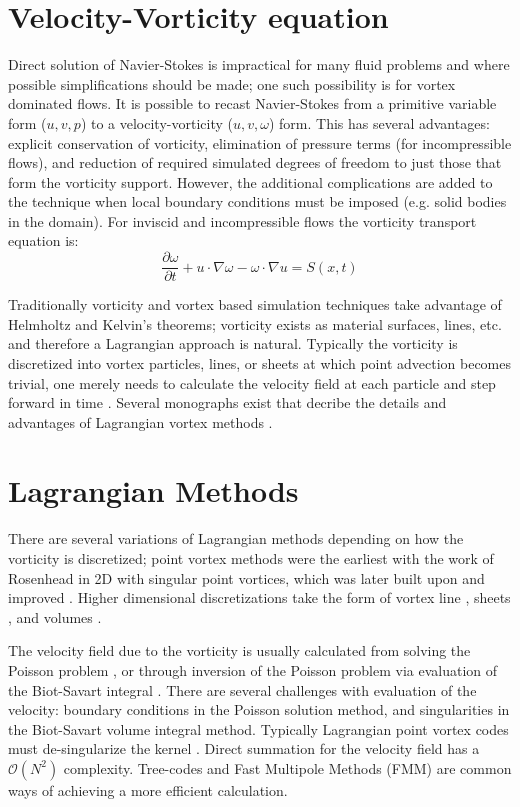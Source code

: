 \documentclass[letterpaper,12pt]{report}
\newcommand{\ben}[1]{\begin{equation}\label{#1}}
\newcommand{\ee}{\end{equation}}
\begin{document}
\section{Velocity-Vorticity equation}
Direct solution of Navier-Stokes is impractical for many fluid problems and where possible simplifications should be made; one such possibility is for vortex dominated flows. It is possible to recast Navier-Stokes from a primitive variable form ($u,v,p$) to a velocity-vorticity ($u,v,\omega$) form. This has several advantages: explicit conservation of vorticity, elimination of pressure terms (for incompressible flows), and reduction of required simulated degrees of freedom to just those that form the vorticity support. However, the additional complications are added to the technique when local boundary conditions must be imposed (e.g. solid bodies in the domain). For inviscid and incompressible flows the vorticity transport equation is:
\ben{VV3D} \frac{\partial \omega}{\partial t} + u \cdot \nabla \omega - \omega \cdot \nabla u = S(x,t)\ee

Traditionally vorticity and vortex based simulation techniques take advantage of Helmholtz and Kelvin's theorems; vorticity exists as material surfaces, lines, etc. and therefore a Lagrangian approach is natural. Typically the vorticity is discretized into vortex particles, lines, or sheets at which point advection becomes trivial, one merely needs to calculate the velocity field at each particle and step forward in time \cite{Strain1996,MoussaCarley2008,KoumLeonard1995}. Several monographs exist that decribe the details and advantages of Lagrangian vortex methods \cite{Lugt1983,Saffman1992,Speziale1987}.

\section{Lagrangian Methods}
There are several variations of Lagrangian methods depending on how the vorticity is discretized; point vortex methods were the earliest with the work of Rosenhead \cite{Point1} in 2D with singular point vortices, which was later built upon and improved \cite{Point2,Point3,Point4,Point5,Point6}. Higher dimensional discretizations take the form of vortex line \cite{Line1,Line2,Line3,Line4}, sheets \cite{Sheet1,Sheet2,Sheet3}, and volumes \cite{Volumes1,Volumes2,Volumes3}.

The velocity field due to the vorticity is usually calculated from solving the Poisson problem \cite{MiscMeth1}, or through inversion of the Poisson problem via evaluation of the Biot-Savart integral \cite{Saffman1992}. There are several challenges with evaluation of the velocity: boundary conditions in the Poisson solution method, and singularities in the Biot-Savart volume integral method. Typically Lagrangian point vortex codes must de-singularize the kernel \cite{Rosenhead1930,Moore1972}. Direct summation for the velocity field has a $\mathcal{O}(N^2)$ complexity. Tree-codes \cite{LindsayKrasny2001} and Fast Multipole Methods (FMM) \cite{Strain1997} are common ways of achieving a more efficient calculation.
\end{document}
